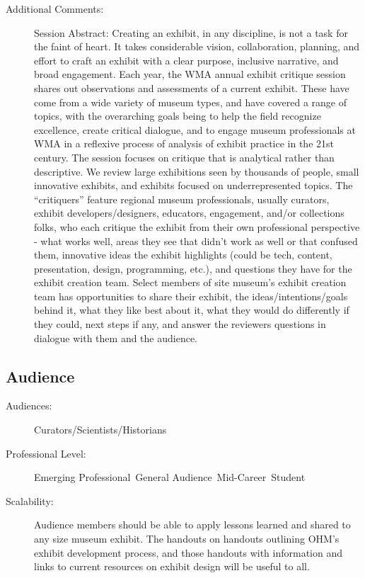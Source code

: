 \documentclass{report}
\begin{document}
\begin{description}
                    \item [Additional Comments: ]Session Abstract: Creating an exhibit, in any discipline, is not a task for the faint of heart. It takes considerable vision, collaboration, planning, and effort to craft an exhibit with a clear purpose, inclusive narrative, and broad engagement. Each year, the WMA annual exhibit critique session shares out observations and assessments of a current exhibit. These have come from a wide variety of museum types, and have covered a range of topics, with the overarching goals being to help the field recognize excellence, create critical dialogue, and to engage museum professionals at WMA in a reflexive process of analysis of exhibit practice in the 21st century. The session focuses on critique that is analytical rather than descriptive. We review large exhibitions seen by thousands of people, small innovative exhibits, and exhibits focused on underrepresented topics. The “critiquers” feature regional museum professionals, usually curators, exhibit developers/designers, educators, engagement, and/or collections folks, who each critique the exhibit from their own professional perspective - what works well, areas they see that didn't work as well or that confused them, innovative ideas the exhibit highlights (could be tech, content, presentation, design, programming, etc.), and questions they have for the exhibit creation team. Select members of site museum’s exhibit creation team has opportunities to share their exhibit, the ideas/intentions/goals behind it, what they like best about it, what they would do differently if they could, next steps if any, and answer the reviewers questions in dialogue with them and the audience.   

                \end{description}
              \subsection*{Audience}
                \begin{description}
                  \item [Audiences:]Curators/Scientists/Historians~
                  \item[Professional Level:]Emerging Professional~General Audience~Mid-Career~Student~
                \item[Scalability:] Audience members should be able to apply lessons learned and shared to any size museum exhibit. The handouts on handouts outlining OHM’s exhibit development process, and those handouts with information and links to current resources on exhibit design will be useful to all.

							
              \end{description}
\end{document}
